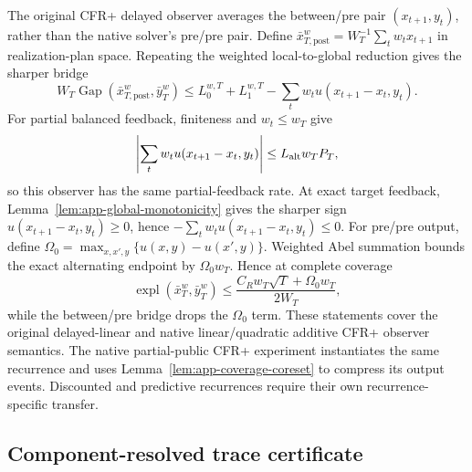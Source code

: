 The original CFR+ delayed observer averages the between/pre pair
$(x_{t+1},y_t)$, rather than the native solver's pre/pre pair.  Define
$\bar x_{T,\mathrm{post}}^w=W_T^{-1}\sum_t w_tx_{t+1}$ in realization-plan
space.  Repeating the weighted local-to-global reduction gives the sharper bridge
\begin{equation}
 W_T\operatorname{Gap}(\bar x_{T,\mathrm{post}}^w,\bar y_T^w)
 \le L_0^{w,T}+L_1^{w,T}
 -\sum_t w_tu(x_{t+1}-x_t,y_t).
\label{eq:app-weighted-between-pre-bridge}
\end{equation}
For partial balanced feedback, finiteness and \(w_t\le w_T\) give
\begin{equation}
\left|\sum_t w_tu(x_{t+1}-x_t,y_t)\right|
\le L_{\rm alt}w_TP_T ,
\label{eq:app-weighted-between-pre-partial}
\end{equation}
so this observer has the same partial-feedback rate.  At exact target
feedback, Lemma~\ref{lem:app-global-monotonicity} gives the sharper sign
$u(x_{t+1}-x_t,y_t)\ge0$, hence
$-\sum_t w_tu(x_{t+1}-x_t,y_t)\le0$.  For pre/pre output, define
$\Omega_0=\max_{x,x',y}\{u(x,y)-u(x',y)\}$.  Weighted Abel summation bounds
the exact alternating endpoint by $\Omega_0w_T$.  Hence at complete coverage
\begin{equation}
 \operatorname{expl}(\bar x_T^w,\bar y_T^w)
 \le \frac{C_Rw_T\sqrt T+\Omega_0w_T}{2W_T},
\label{eq:app-weighted-exact-boundary}
\end{equation}
while the between/pre bridge drops the $\Omega_0$ term.  These statements
cover the original delayed-linear and native linear/quadratic additive CFR+
observer semantics.  The native partial-public CFR+ experiment instantiates
the same recurrence and uses Lemma~\ref{lem:app-coverage-coreset} to compress
its output events.  Discounted and predictive recurrences require their own
recurrence-specific transfer.

\subsection{Component-resolved trace certificate}
\label{app:deadline-variation}

